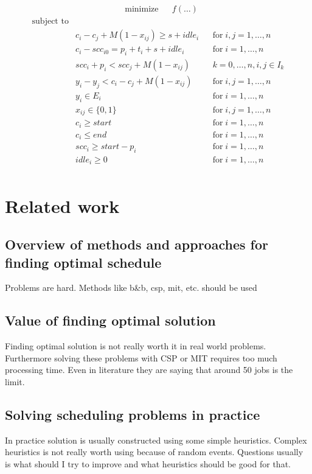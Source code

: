 \documentclass{ctuthesis}
\begin{document}
\begin{equation}
\begin{aligned}
&\text{minimize}
&&f(\ldots)
\end{aligned}
\end{equation}
\begin{equation}
\begin{aligned}
\text{subject to}\\
& c_{i} - c_{j} + M(1 - x_{ij}) \geq s + idle_{i} && \text{for}\; i,j = 1, \ldots, n\\
& c_{i} - scc_{i0} = p_{i} + t_i + s + idle_i && \text{for}\; i = 1, \ldots, n\\
& scc_{i} + p_i < scc_j + M(1 - x_{ij}) && k = 0,\ldots,n, i,j \in I_k\\
& y_{i} - y_{j} < c_i - c_j + M(1 - x_{ij}) && \text{for}\; i,j = 1, \ldots, n\\
& y_i \in E_i && \text{for}\; i = 1, \ldots, n\\
& x_{ij} \in \{0, 1\}  && \text{for}\; i,j = 1, \ldots, n\\ 
& c_i \geq start && \text{for}\; i = 1, \ldots, n\\
& c_i \leq end && \text{for}\; i = 1, \ldots, n\\
& scc_{i} \geq start - p_i && \text{for}\; i = 1, \ldots, n\\
& idle_i \geq 0 && \text{for}\; i = 1, \ldots, n\\
\end{aligned}
\end{equation}

\chapter{Related work}

\section{Overview of methods and approaches for finding optimal schedule}
Problems are hard. Methods like b\&b, csp, mit, etc. should be used
\section{Value of finding optimal solution}
Finding optimal solution is not really worth it in real world problems. Furthermore solving these problems with CSP or MIT requires too much processing time. Even in literature they are saying that around 50 jobs is the limit. 
\section{Solving scheduling problems in practice}
In practice solution is usually constructed using some simple heuristics. Complex heuristics is not really worth using because of random events. Questions usually is what should I try to improve and what heuristics should be good for that. 
\end{document}
